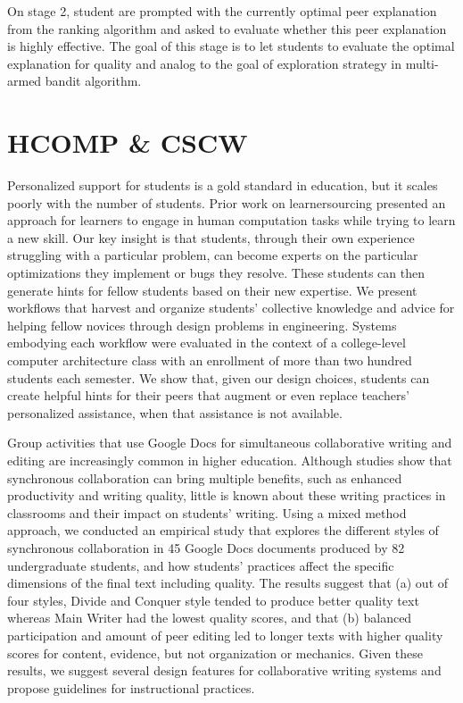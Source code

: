 \documentclass{article}
\begin{document}
On stage 2, student are prompted with the currently optimal peer explanation
from the ranking algorithm and asked to evaluate whether this peer
explanation is highly effective. The goal of this stage is to let
students to evaluate the optimal explanation for quality and analog to
the goal of exploration strategy in multi-armed bandit algorithm.

\section{HCOMP \& CSCW}
\cite{Glassman2016-yy}
Personalized support for students is a gold standard in education,
but it scales poorly with the number of students. Prior
work on learnersourcing presented an approach for learners
to engage in human computation tasks while trying to learn
a new skill. Our key insight is that students, through their
own experience struggling with a particular problem, can
become experts on the particular optimizations they implement
or bugs they resolve. These students can then generate
hints for fellow students based on their new expertise. We
present workflows that harvest and organize students’ collective
knowledge and advice for helping fellow novices through
design problems in engineering. Systems embodying each
workflow were evaluated in the context of a college-level
computer architecture class with an enrollment of more than
two hundred students each semester. We show that, given
our design choices, students can create helpful hints for their
peers that augment or even replace teachers’ personalized assistance,
when that assistance is not available.

\cite{Yim2017-zt}
Group activities that use Google Docs for simultaneous
collaborative writing and editing are increasingly common
in higher education. Although studies show that
synchronous collaboration can bring multiple benefits, such
as enhanced productivity and writing quality, little is known
about these writing practices in classrooms and their impact
on students’ writing. Using a mixed method approach, we
conducted an empirical study that explores the different
styles of synchronous collaboration in 45 Google Docs
documents produced by 82 undergraduate students, and how
students’ practices affect the specific dimensions of the final
text including quality. The results suggest that (a) out of
four styles, Divide and Conquer style tended to produce
better quality text whereas Main Writer had the lowest
quality scores, and that (b) balanced participation and
amount of peer editing led to longer texts with higher
quality scores for content, evidence, but not organization or
mechanics. Given these results, we suggest several design
features for collaborative writing systems and propose
guidelines for instructional practices.
\end{document}

